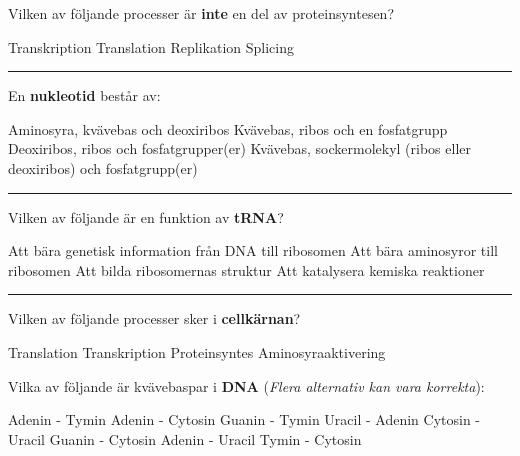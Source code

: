 \documentclass{exam}
\begin{document}
\begin{questions}

\question Vilken av följande processer är \textbf{inte} en del av proteinsyntesen?
\begin{checkboxes}
    \choice Transkription
    \choice Translation
    \correctchoice Replikation
    \choice Splicing
\end{checkboxes}

\vspace{5mm}
\hrule
\vspace{5mm}

\question En \textbf{nukleotid} består av:
\begin{checkboxes}
   \choice Aminosyra, kvävebas och deoxiribos
   \choice Kvävebas, ribos och en fosfatgrupp
   \choice Deoxiribos, ribos och fosfatgrupper(er)
   \correctchoice Kvävebas, sockermolekyl (ribos eller deoxiribos) och fosfatgrupp(er)
\end{checkboxes} 

\vspace{5mm}
\hrule
\vspace{5mm} 

\question Vilken av följande är en funktion av \textbf{tRNA}?
\begin{checkboxes}
\choice Att bära genetisk information från DNA till ribosomen
\correctchoice Att bära aminosyror till ribosomen
\choice Att bilda ribosomernas struktur
\choice Att katalysera kemiska reaktioner
\end{checkboxes}

\vspace{5mm} %
\hrule
\vspace{5mm} %

\question Vilken av följande processer sker i \textbf{cellkärnan}?
\begin{checkboxes}
\choice Translation
\correctchoice Transkription
\choice Proteinsyntes
\choice Aminosyraaktivering
\end{checkboxes}

\break

\question Vilka av följande är kvävebaspar i \textbf{DNA} (\textit{Flera alternativ kan vara korrekta}):
\begin{checkboxes}
\correctchoice Adenin - Tymin
\choice Adenin - Cytosin
\choice Guanin - Tymin
\choice Uracil - Adenin
\choice Cytosin - Uracil
\correctchoice Guanin - Cytosin
\choice Adenin - Uracil
\choice Tymin - Cytosin
\end{checkboxes}


\end{questions}
\end{document}
